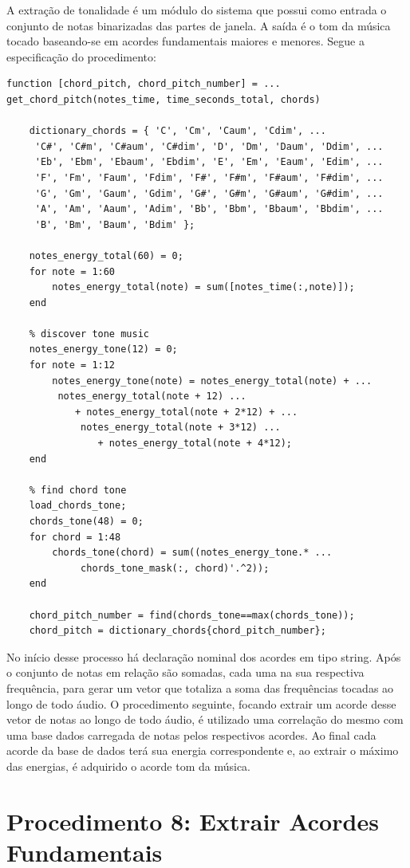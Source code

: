 A extração de tonalidade é um módulo do sistema que possui como entrada o conjunto de notas binarizadas das partes de janela. A saída é o tom da música tocado baseando-se em acordes fundamentais maiores e menores. Segue a especificação do procedimento:
\begin{lstlisting}
function [chord_pitch, chord_pitch_number] = ...
get_chord_pitch(notes_time, time_seconds_total, chords)
	
	dictionary_chords = { 'C', 'Cm', 'Caum', 'Cdim', ...
     'C#', 'C#m', 'C#aum', 'C#dim', 'D', 'Dm', 'Daum', 'Ddim', ...
     'Eb', 'Ebm', 'Ebaum', 'Ebdim', 'E', 'Em', 'Eaum', 'Edim', ...
     'F', 'Fm', 'Faum', 'Fdim', 'F#', 'F#m', 'F#aum', 'F#dim', ...
     'G', 'Gm', 'Gaum', 'Gdim', 'G#', 'G#m', 'G#aum', 'G#dim', ...
     'A', 'Am', 'Aaum', 'Adim', 'Bb', 'Bbm', 'Bbaum', 'Bbdim', ...
     'B', 'Bm', 'Baum', 'Bdim' };

	notes_energy_total(60) = 0;
	for note = 1:60
		notes_energy_total(note) = sum([notes_time(:,note)]);
	end

	% discover tone music
	notes_energy_tone(12) = 0;
	for note = 1:12
		notes_energy_tone(note) = notes_energy_total(note) + ...
		 notes_energy_total(note + 12) ...
			+ notes_energy_total(note + 2*12) + ...
			 notes_energy_total(note + 3*12) ...
				+ notes_energy_total(note + 4*12);
	end

	% find chord tone
	load_chords_tone;
	chords_tone(48) = 0;
	for chord = 1:48
		chords_tone(chord) = sum((notes_energy_tone.* ...
			 chords_tone_mask(:, chord)'.^2));
	end

	chord_pitch_number = find(chords_tone==max(chords_tone));
	chord_pitch = dictionary_chords{chord_pitch_number};

\end{lstlisting}

No início desse processo há declaração nominal dos acordes em tipo string. Após o conjunto de notas em relação são somadas, cada uma na sua respectiva frequência, para gerar um vetor que totaliza a soma das frequências tocadas ao longo de todo áudio. O procedimento seguinte, focando extrair um acorde desse vetor de notas ao longo de todo áudio, é utilizado uma correlação do mesmo com uma base dados carregada de notas pelos respectivos acordes. Ao final cada acorde da base de dados terá sua energia correspondente e, ao extrair o máximo das energias, é adquirido o acorde tom da música.

\section{Procedimento 8: Extrair Acordes Fundamentais}

